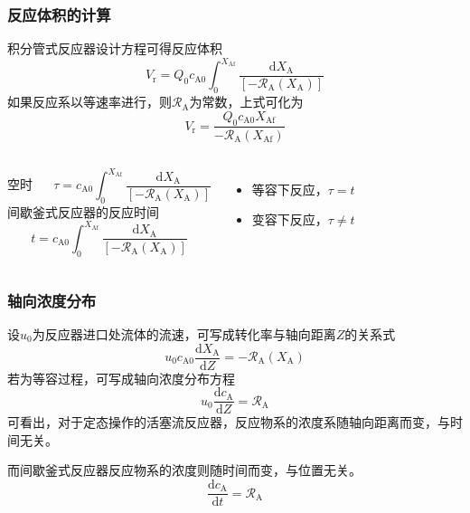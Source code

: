 \begin{frame}
    \frametitle{反应体积的计算}

    积分管式反应器设计方程可得反应体积
    \[
        V_{\mathrm{r}}=Q_{0} c_{\mathrm{A} 0} \int_{0}^{X_{\mathrm{Af}}} \frac{\mathrm{d} X_{\mathrm{A}}}{[-\mathscr{R}_{\mathrm{A}}(X_{\mathrm{A}})]}
    \]
    如果反应系以等速率进行，则$\mathscr{R}_{\mathrm{A}}$为常数，上式可化为
    \[
        V_{\mathrm{r}}=\frac{Q_{0} c_{\mathrm{A} 0} X_{\mathrm{Af}}}{-\mathscr{R}_{\mathrm{A}}(X_{\mathrm{Af}})}
    \]
    \begin{columns}[c]
        \column{6.5cm}        
        \[
            \text{空时}~~~\quad \tau=c_{\mathrm{A} 0} \int_{0}^{X_{\mathrm{Af}}} \frac{\mathrm{d} X_{\mathrm{A}}}{[-\mathscr{R}_{\mathrm{A}}\left(X_{\mathrm{A}}\right)]} 
        \]
        间歇釜式反应器的反应时间
        \[
            t=c_{\mathrm{A} 0} \int_{0}^{X_{\mathrm{Af}}} \frac{\mathrm{d} X_{\mathrm{A}}}{[-\mathscr{R}_{\mathrm{A}}\left(X_{\mathrm{A}}\right)]} 
        \]
        \column{7cm}
            \begin{itemize}
                \item[\bullet] 等容下反应，$\tau=t$
                \item[\bullet] 变容下反应，$\tau \neq t$
            \end{itemize}
    \end{columns}
\end{frame}


\begin{frame}
    \frametitle{轴向浓度分布}

    设$u_0$为反应器进口处流体的流速，可写成转化率与轴向距离$Z$的关系式
    \[
        u_0 c_{\mathrm{A0}} \frac{\mathrm{d} X_{\mathrm{A}}}{\mathrm{d} Z}=-\mathscr{R}_{\mathrm{A}}(X_{\mathrm{A}})
    \]
    若为等容过程，可写成轴向浓度分布方程
    \[
        u_0 \frac{\mathrm{d} c_{\mathrm{A}}}{\mathrm{d} Z}=\mathscr{R}_{\mathrm{A}}
    \]
    可看出，对于定态操作的活塞流反应器，反应物系的浓度系随轴向距离而变，与时间无关。

    而间歇釜式反应器反应物系的浓度则随时间而变，与位置无关。
    \[
        \frac{\mathrm{d} c_{\mathrm{A}}}{\mathrm{d} t}=\mathscr{R}_{\mathrm{A}}
    \]

\end{frame}


